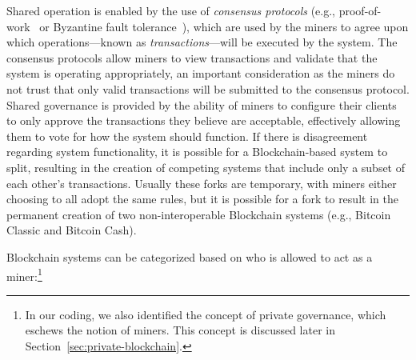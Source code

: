 Shared operation is enabled by the use of \emph{consensus protocols} (e.g., proof-of-work~\cite{DN93,back1997partial,NakamotoS8} or Byzantine fault tolerance~\cite{castro1999practical}), which are used by the miners to agree upon which operations---known as \emph{transactions}---will be executed by the system.
The consensus protocols allow miners to view transactions and validate that the system is operating appropriately, an important consideration as the miners do not trust that only valid transactions will be submitted to the consensus protocol.
Shared governance is provided by the ability of miners to configure their clients to only approve the transactions they believe are acceptable, effectively allowing them to vote for how the system should function.
If there is disagreement regarding system functionality, it is possible for a Blockchain-based system to split, resulting in the creation of competing systems that include only a subset of each other's transactions.
Usually these forks are temporary, with miners either choosing to all adopt the same rules, but it is possible for a fork to result in the permanent creation of two non-interoperable Blockchain systems (e.g., Bitcoin Classic and Bitcoin Cash).


Blockchain systems can be categorized based on who is allowed to act as a miner:\footnote{In our coding, we also identified the concept of private governance, which eschews the notion of miners. This concept is discussed later in Section~\ref{sec:private-blockchain}.}

